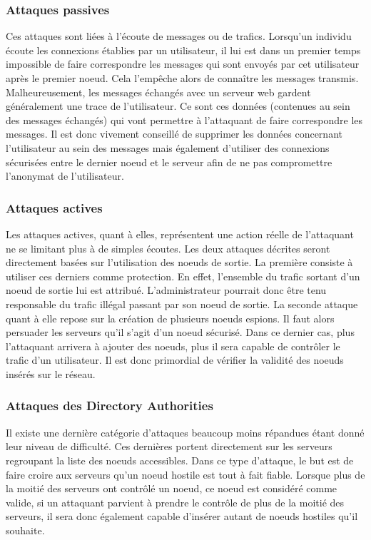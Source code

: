 \documentclass[letterpaper]{article}
\begin{document}
\subsubsection{Attaques passives} Ces attaques sont liées à l'écoute de messages ou de trafics. Lorsqu'un individu écoute les connexions établies par un utilisateur, il lui est dans un premier temps impossible de faire correspondre les messages qui sont envoyés par cet utilisateur après le premier noeud. Cela l'empêche alors de connaître les messages transmis. Malheureusement, les messages échangés avec un serveur web gardent généralement une trace de l'utilisateur. Ce sont ces données (contenues au sein des messages échangés) qui vont permettre à l'attaquant de faire correspondre les messages. Il est donc vivement conseillé de supprimer les données concernant l'utilisateur au sein des messages mais également d'utiliser des connexions sécurisées entre le dernier noeud et le serveur afin de ne pas compromettre l'anonymat de l'utilisateur.
\subsubsection{Attaques actives} Les attaques actives, quant à elles, représentent une action réelle de l'attaquant ne se limitant plus à de simples écoutes. Les deux attaques décrites seront directement basées sur l'utilisation des noeuds de sortie. La première consiste à utiliser ces derniers comme protection. En effet, l'ensemble du trafic sortant d'un noeud de sortie lui est attribué. L'administrateur pourrait donc être tenu responsable du trafic illégal passant par son noeud de sortie. La seconde attaque quant à elle repose sur la création de plusieurs noeuds espions. Il faut alors persuader les serveurs qu'il s'agit d'un noeud sécurisé. Dans ce dernier cas, plus l'attaquant arrivera à ajouter des noeuds, plus il sera capable de contrôler le trafic d'un utilisateur.  Il est donc primordial de vérifier la validité des noeuds insérés sur le réseau.
\subsubsection{Attaques des Directory Authorities} Il existe une dernière catégorie d'attaques beaucoup moins répandues étant donné leur niveau de difficulté. Ces dernières portent directement sur les serveurs regroupant la liste des noeuds accessibles. Dans ce type d'attaque, le but est de faire croire aux serveurs qu'un noeud hostile est tout à fait fiable. Lorsque plus de la moitié des serveurs ont contrôlé un noeud, ce noeud est considéré comme valide, si un attaquant parvient à prendre le contrôle de plus de la moitié des serveurs, il sera donc également capable d'insérer autant de noeuds hostiles qu'il souhaite. \\
\end{document}
